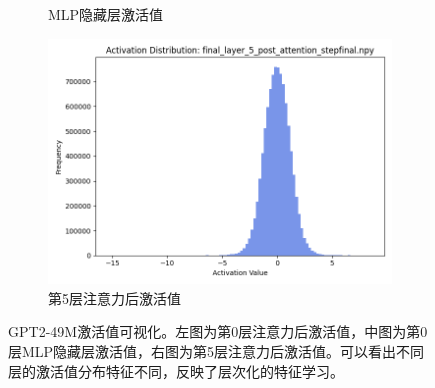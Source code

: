 \documentclass{article}
\begin{document}
\begin{figure}[H]
\begin{subfigure}[b]{0.3\textwidth}
\caption{MLP隐藏层激活值}
\label{fig:act_49m_l0_mlp}
\end{subfigure}
\hfill
\begin{subfigure}[b]{0.3\textwidth}
\includegraphics[width=\textwidth]{../visualize/activations/GPT2-49M/final_layer_5_post_attention_stepfinal.png}
\caption{第5层注意力后激活值}
\label{fig:act_49m_l5_post}
\end{subfigure}
\caption{GPT2-49M激活值可视化。左图为第0层注意力后激活值，中图为第0层MLP隐藏层激活值，右图为第5层注意力后激活值。可以看出不同层的激活值分布特征不同，反映了层次化的特征学习。}
\label{fig:act_49m_comparison}
\end{figure}

\vspace{0.5cm}
\end{document}
